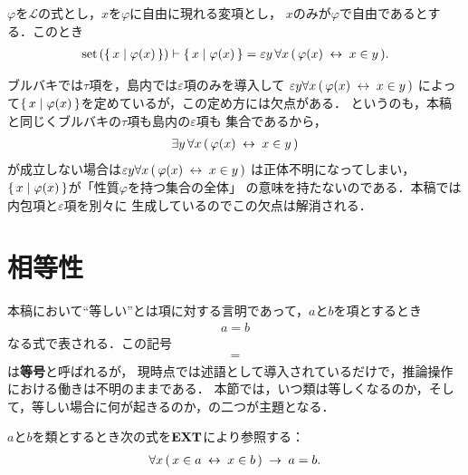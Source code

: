 	\begin{screen}
		\begin{thm}
		\label{thm:if_a_class_is_a_set_then_equal_to_some_epsilon_term}
			$\varphi$を$\mathcal{L}$の式とし，$x$を$\varphi$に自由に現れる変項とし，
			$x$のみが$\varphi$で自由であるとする．このとき
			\begin{align}
				\operatorname*{set}\hspace{0.15em}(\{\, x \mid \varphi(x)\, \}) \vdash \{\, x \mid \varphi(x)\, \} 
				= \varepsilon y\, \forall x\, (\, \varphi(x) \hspace{0.25em}\leftrightarrow\hspace{0.25em} x \in y\, ).
			\end{align}
		\end{thm}
	\end{screen}
	
	ブルバキ\cite{key4}では$\tau$項を，島内\cite{key6}では$\varepsilon$項のみを導入して
	$\varepsilon y \forall x\, (\, \varphi(x) \hspace{0.25em}\leftrightarrow\hspace{0.25em} x \in y\, )$
	によって$\{\, x \mid \varphi(x)\, \}$を定めているが，この定め方には欠点がある．
	というのも，本稿と同じくブルバキ\cite{key4}の$\tau$項も島内\cite{key6}の$\varepsilon$項も
	集合であるから，
	\begin{align}
		\exists y\, \forall x\, (\, \varphi(x) \hspace{0.25em}\leftrightarrow\hspace{0.25em} x \in y\, )
	\end{align}
	が成立しない場合は$\varepsilon y \forall x\, (\, \varphi(x) \hspace{0.25em}\leftrightarrow\hspace{0.25em} x \in y\, )$
	は正体不明になってしまい，$\{\, x \mid \varphi(x)\, \}$が「性質$\varphi$を持つ集合の全体」
	の意味を持たないのである．本稿では内包項と$\varepsilon$項を別々に
	生成しているのでこの欠点は解消される．
	
\section{相等性}
	本稿において``等しい''とは項に対する言明であって，$a$と$b$を項とするとき
	\begin{align}
		a = b
	\end{align}
	なる式で表される．この記号
	\begin{align}
		=
	\end{align}
	は{\bf 等号}と呼ばれるが，
	現時点では述語として導入されているだけで，推論操作における働きは不明のままである．
	本節では，いつ類は等しくなるのか，そして，等しい場合に何が起きるのか，の二つが主題となる．
	
	\begin{screen}
		\begin{axm}
			$a$と$b$を類とするとき次の式を$\mbox{{\bf EXT}}$により参照する：
			\begin{align}
				\forall x\, (\, x \in a \hspace{0.25em}\leftrightarrow\hspace{0.25em} x \in b\, ) \hspace{0.25em}\rightarrow\hspace{0.25em} a=b.
			\end{align}
		\end{axm}
	\end{screen}
	
